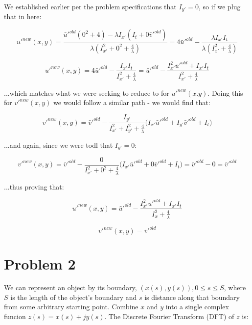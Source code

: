 \documentclass{article}
\begin{document}
\noindent We established earlier per the problem specifications that $I_{y'}=0$, so if we plug that in here:

\begin{equation}
    u'^{new}(x,y) = \frac
    {\bar{u}'^{old} (0^2 + 4) - \lambda I_{x'} (I_t + 0 \bar{v}'^{old})}
    {\lambda (I_{x'}^2 + 0^2 + \frac{4}{\lambda})} = 4\bar{u}'^{old} - \frac{\lambda I_{x'} I_t}{\lambda(I_{x'}^2+\frac{4}{\lambda})}
\end{equation}

\begin{equation}
    u'^{new}(x,y) = 4\bar{u}'^{old}-\frac{I_{x'}I_t}{I_{x'}^2 + \frac{4}{\lambda}} = \bar{u}'^{old} - \frac{I_{x'}^2 \bar{u}'^{old} + I_{x'}I_t}{I_{x'}^2+\frac{4}{\lambda}}
\end{equation}

\noindent ...which matches what we were seeking to reduce to for $u'^{new}(x.y)$. Doing this for $v'^{new}(x,y)$ we would follow a similar path - we would find that:

\begin{equation}
    v'^{new}(x,y) = \bar{v}'^{old} - \frac{I_{y'}}{I_{x'}^2 + I_{y'}^2 + \frac{4}{\lambda}}\bigl( I_{x'}\bar{u}'^{old} + I_{y'}\bar{v}'^{old} + I_t \bigr)
\end{equation}

\noindent ...and again, since we were todl that $I_{y'} = 0$:

\begin{equation}
    v'^{new}(x,y) = \bar{v}'^{old} - \frac{0}{I_{x'}^2 + 0^2 + \frac{4}{\lambda}}\bigl( I_{x'}\bar{u}'^{old} + 0\bar{v}'^{old} + I_t \bigr) = \bar{v}'^{old} - 0 = \bar{v}'^{old}
\end{equation}

\noindent ...thus proving that:

\begin{equation}
    u'^{new}(x,y) = \bar{u}'^{old} - \frac{I_{x'}^2 \bar{u}'^{old} + I_{x'}I_t}{I_x^2+\frac{4}{\lambda}}
\end{equation}

\begin{equation}
    v'^{new}(x,y) = \bar{v}'^{old}
\end{equation}



\section*{Problem 2}

We can represent an object by its boundary, $(x(s),y(s)),0\leq s \leq S$, where $S$ is the length of the object's boundary and $s$ is distance along that boundary from some arbitrary starting point. Combine $x$ and $y$ into a single complex funcion $z(s)=x(s)+jy(s)$. The Discrete Fourier Transform (DFT) of $z$ is:
\end{document}
